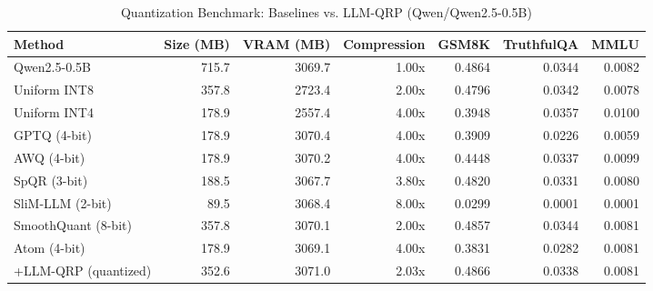 \begin{table}[htbp]
  \centering
  \small
  \caption{Quantization Benchmark: Baselines vs. LLM-QRP (Qwen/Qwen2.5-0.5B)}
  \label{tab:benchmark}
  \begin{tabular}{lrrrrrr}
    \toprule
    \textbf{Method} & \textbf{Size (MB)} & \textbf{VRAM (MB)} & \textbf{Compression} & \textbf{GSM8K} & \textbf{TruthfulQA} & \textbf{MMLU} \\
    \midrule
    Qwen2.5-0.5B & 715.7 & 3069.7 & 1.00x & 0.4864 & 0.0344 & 0.0082 \\
    Uniform INT8 & 357.8 & 2723.4 & 2.00x & 0.4796 & 0.0342 & 0.0078 \\
    Uniform INT4 & 178.9 & 2557.4 & 4.00x & 0.3948 & 0.0357 & 0.0100 \\
    GPTQ (4-bit) & 178.9 & 3070.4 & 4.00x & 0.3909 & 0.0226 & 0.0059 \\
    AWQ (4-bit) & 178.9 & 3070.2 & 4.00x & 0.4448 & 0.0337 & 0.0099 \\
    SpQR (3-bit) & 188.5 & 3067.7 & 3.80x & 0.4820 & 0.0331 & 0.0080 \\
    SliM-LLM (2-bit) & 89.5 & 3068.4 & 8.00x & 0.0299 & 0.0001 & 0.0001 \\
    SmoothQuant (8-bit) & 357.8 & 3070.1 & 2.00x & 0.4857 & 0.0344 & 0.0081 \\
    Atom (4-bit) & 178.9 & 3069.1 & 4.00x & 0.3831 & 0.0282 & 0.0081 \\
    \midrule
    +LLM-QRP (quantized) & 352.6 & 3071.0 & 2.03x & 0.4866 & 0.0338 & 0.0081 \\
    \bottomrule
  \end{tabular}
\end{table}
